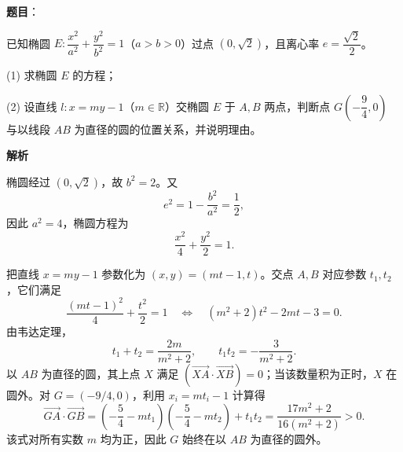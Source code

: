 \begin{answer}

\textbf{题目}：

已知椭圆 $E:\dfrac{x^2}{a^2}+\dfrac{y^2}{b^2}=1$（$a>b>0$）过点 $(0,\sqrt2)$，且离心率 $e=\dfrac{\sqrt2}{2}$。

(1) 求椭圆 $E$ 的方程；

(2) 设直线 $l:x=my-1$（$m\in\mathbb{R}$）交椭圆 $E$ 于 $A,B$ 两点，判断点 $G\!\left(-\dfrac94,0\right)$ 与以线段 $AB$ 为直径的圆的位置关系，并说明理由。
\nopagebreak[4]
\begin{center}\end{center}
\nopagebreak[4]
\textbf{解析}


椭圆经过 $(0,\sqrt2)$，故 $b^2=2$。又
\nopagebreak[4]
\[
e^2=1-\frac{b^2}{a^2}=\frac12,
\]
因此 $a^2=4$，椭圆方程为
\nopagebreak[4]
\[
\frac{x^2}{4}+\frac{y^2}{2}=1.
\]


把直线 $x=my-1$ 参数化为 $(x,y)=(mt-1,t)$。交点 $A,B$ 对应参数 $t_1,t_2$，它们满足
\nopagebreak[4]
\[
\frac{(mt-1)^2}{4}+\frac{t^2}{2}=1
\quad\Longleftrightarrow\quad
(m^2+2)t^2-2mt-3=0.
\]
由韦达定理，
\nopagebreak[4]
\[
t_1+t_2=\frac{2m}{m^2+2},\qquad
t_1t_2=-\frac3{m^2+2}.
\]
以 $AB$ 为直径的圆，其上点 $X$ 满足
$(\overrightarrow{XA}\cdot\overrightarrow{XB})=0$；当该数量积为正时，$X$ 在圆外。对 $G=(-9/4,0)$，利用 $x_i=mt_i-1$ 计算得
\nopagebreak[4]
\[
\overrightarrow{GA}\cdot\overrightarrow{GB}
=\left(-\frac54-mt_1\right)\left(-\frac54-mt_2\right)+t_1t_2
=\frac{17m^2+2}{16(m^2+2)}>0.
\]
该式对所有实数 $m$ 均为正，因此 $G$ 始终在以 $AB$ 为直径的圆外。



\end{answer}
